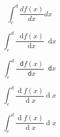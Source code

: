 \documentclass{beamer}
\newcommand{\diffA}{\mathop{}\!\mathrm{d}}
\newcommand{\diffB}{\mathop{}\!\mathsf{d}}
\newcommand{\diffC}{\operatorname{d}\!} %
\DeclareMathOperator{\diffD}{d} %
\begin{document}
\begin{frame}
\[
  \int_{c}^{d}\frac{df(x)}{dx} dx
\]

\[
  \int_{c}^{d}\frac{\diffA f(x)}{\diffA x} \diffA x
\]

\[
  \int_{c}^{d}\frac{\diffB f(x)}{\diffB x} \diffB x
\]

\[
  \int_{c}^{d}\frac{\diffC f(x)}{\diffC x} \diffC x
\]

\[
  \int_{c}^{d}\frac{\diffD f(x)}{\diffD x} \diffD x
\]
\end{frame}
\end{document}
